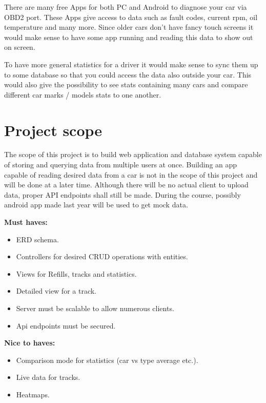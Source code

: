 There are many free Apps for both PC and Android to diagnose your car via OBD2 port.
These Apps give access to data such as fault codes, current rpm, oil temperature and many more.
Since older cars don't have fancy touch screens it would make sense to have some app running and reading this data to show out on screen.

To have more general statistics for a driver it would make sense to sync them up to some database so that you could access the data also outside your car.
This would also give the possibility to see stats containing many cars and compare different car marks / models stats to one another.


\section{Project scope}\label{sec:project-scope}
The scope of this project is to build web application and database system capable of storing and querying data from multiple users at once.
Building an app capable of reading desired data from a car is not in the scope of this project and will be done at a later time.
Although there will be no actual client to upload data, proper API endpoints shall still be made.
During the course, possibly android app made last year will be used to get mock data.

\textbf{Must haves:}
\begin{itemize}
    \item ERD schema.
    \item Controllers for desired CRUD operations with entities.
    \item Views for Refills, tracks and statistics.
    \item Detailed view for a track.
    \item Server must be scalable to allow numerous clients.
    \item Api endpoints must be secured.
\end{itemize}

\textbf{Nice to haves:}
\begin{itemize}
    \item Comparison mode for statistics (car vs type average etc.).
    \item Live data for tracks.
    \item Heatmaps.
\end{itemize}